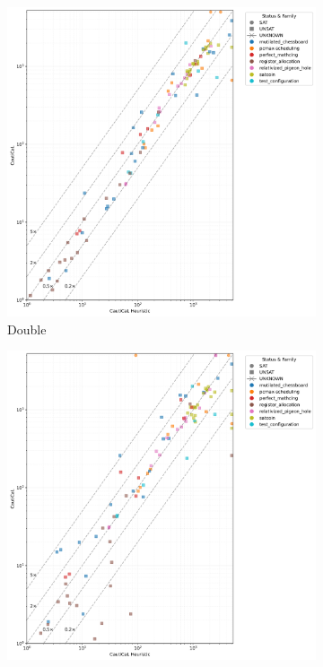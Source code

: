 \begin{figure}[!t]
    \centering
    \begin{subfigure}[t]{0.3\textwidth}
            \centering
            \includegraphics[width=\textwidth]{figs/globaldouble_heuristic_comparison.jpg}
            \caption{Double}
            \label{fig:cautical-vs-cadical}
    \end{subfigure}
    \begin{subfigure}[t]{0.3\textwidth}
        \centering
        \includegraphics[width=\textwidth]{figs/globalisort_heuristic_comparison.jpg}

\end{subfigure}
\end{figure}

